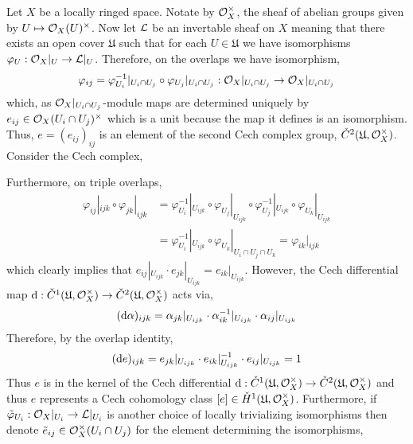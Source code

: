 \documentclass[12pt]{article}
\begin{document}
Let $X$ be a locally ringed space. Notate by $\mathcal{O}_{X}^\times$, the sheaf of abelian groups given by $U \mapsto \mathcal{O}_{X}(U)^\times$. Now let $\mathcal{L}$ be an invertable sheaf on $X$ meaning that there exists an open cover $\mathfrak{U}$ such that for each $U \in \mathfrak{U}$ we have isomorphisms $\varphi_U : \mathcal{O}_{X}|_U \to \mathcal{L}|_U$. Therefore, on the overlaps we have isomorphism,
\[ \varphi_{ij} = \varphi_{U_i}^{-1}|_{U_i \cap U_j} \circ \varphi_{U_j} |_{U_i \cap U_j} : \mathcal{O}_{X} |_{U_i \cap U_j} \to \mathcal{O}_{X} |_{U_i \cap U_j} \]
which, as $\mathcal{O}_{X}|_{U_i \cap U_j}$-module maps are determined uniquely by $e_{ij} \in \mathcal{O}_{X}(U_i \cap U_j)^\times$ which is a unit because the map it defines is an isomorphism. Thus, $e = (e_{ij})_{ij}$ is an element of the second Cech complex group, $\check{C}^2(\mathfrak{U}, \mathcal{O}_{X}^\times)$. Consider the Cech complex,
\begin{center}
\end{center}
Furthermore, on triple overlaps,
\begin{align*}
\varphi_{ij}|_{ijk} \circ \varphi_{jk}|_{ijk} & = \varphi_{U_i}^{-1}|_{U_{ijk}} \circ \varphi_{U_j} |_{U_{ijk}} \circ \varphi_{U_j}^{-1}|_{U_{ijk}} \circ \varphi_{U_k} |_{U_{ijk}} 
\\
& = \varphi_{U_i}^{-1}|_{U_{ijk}} \circ \varphi_{U_k} |_{U_i \cap U_j \cap U_k} = \varphi_{ik} |_{ijk} 
\end{align*}
which clearly implies that $e_{ij} |_{U_{ijk}} \cdot e_{jk} |_{U_{ijk}} = e_{ik} |_{U_{ijk}}$. However, the Cech differential map $\mathrm{d} : \check{C}^1(\mathfrak{U}, \mathcal{O}_{X}^\times) \to \check{C}^2(\mathfrak{U}, \mathcal{O}_{X}^\times)$ acts via,
\[ (\mathrm{d}{\alpha})_{ijk} = \alpha_{jk} |_{U_{ijk}} \cdot \alpha_{ik}^{-1} |_{U_{ijk}} \cdot \alpha_{ij} |_{U_{ijk}} \]
Therefore, by the overlap identity,
\[ (\mathrm{d}{e})_{ijk} = e_{jk}|_{U_{ijk}} \cdot e_{ik}|_{U_{ijk}}^{-1} \cdot e_{ij} |_{U_{ijk}} = 1 \]
Thus $e$ is in the kernel of the Cech differential $\mathrm{d} : \check{C}^1(\mathfrak{U}, \mathcal{O}_{X}^\times) \to \check{C}^2(\mathfrak{U}, \mathcal{O}_{X}^\times)$ and thus $e$ represents a Cech cohomology class $[e] \in \check{H}^1(\mathfrak{U}, \mathcal{O}_{X}^\times)$. Furthermore, if $\tilde{\varphi}_{U_i} : \mathcal{O}_{X} |_{U_i} \to \mathcal{L} |_{U_i}$ is another choice of locally trivializing isomorphisms then denote $\tilde{e}_{ij} \in \mathcal{O}_{X}^\times(U_i \cap U_j)$ for the element determining the isomorphisms,
\end{document}
